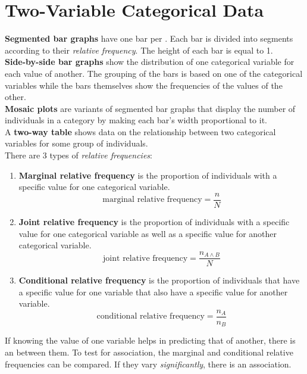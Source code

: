 \documentclass[../AP_Statistics.tex]{subfiles}
\begin{document}
	\chapter{Two-Variable Categorical Data}
		\textbf{Segmented bar graphs} have one bar per . Each bar is divided into segments according to their \emph{relative frequency}. The height of each bar is equal to 1. \\
		\textbf{Side-by-side bar graphs} show the distribution of one categorical variable for each value of another. The grouping of the bars is based on one of the categorical variables while the bars themselves show the frequencies of the values of the other. \\
		\textbf{Mosaic plots} are variants of segmented bar graphs that display the number of individuals in a category by making each bar's width proportional to it. \\
		A \textbf{two-way table} shows data on the relationship between two categorical variables for some group of individuals. \\
		There are 3 types of \emph{relative frequencies}:
		\begin{enumerate}
			\item \textbf{Marginal relative frequency} is the proportion of individuals with a specific value for one categorical variable.
				\[\text{marginal relative frequency} = \frac{n}{N}\]
			\item \textbf{Joint relative frequency} is the proportion of individuals with a specific value for one categorical variable as well as a specific value for another categorical variable.
				\[\text{joint relative frequency} = \frac{n_{A\land B}}{N}\]
			\item \textbf{Conditional relative frequency} is the proportion of individuals that have a specific value for one variable that also have a specific value for another variable.
				\[\text{conditional relative frequency} = \frac{n_A}{n_B}\]
		\end{enumerate}
			If knowing the value of one variable helps in predicting that of another, there is an  between them. To test for association, the marginal and conditional relative frequencies can be compared. If they vary \emph{significantly}, there is an association.
\end{document}
